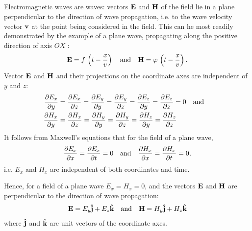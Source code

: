 \subsection{}\label{31.1.4} Electromagnetic waves are  waves: vectors $\vb{E}$ and $\vb{H}$ of the field lie in a plane perpendicular to the direction of wave propagation, i.e. to the wave velocity vector $\vb{v}$ at the point being considered in the field. This can he most readily demonstrated by the example of a plane wave, propagating along the positive direction of axis $OX$ :
\begin{equation*}%
\vb{E} = f\,\left(t - \frac{x}{v} \right) \qand \vb{H} = \varphi\,\left(t - \frac{x}{v} \right).
\end{equation*}
Vector $\vb{E}$ and $\vb{H}$ and their projections on the coordinate axes are independent of $y$ and $z$:
\begin{align*}%
\pdv{E_{x}}{y} & = \pdv{E_{x}}{z}= \pdv{E_{y}}{y} =\pdv{E_{y}}{z}= \pdv{E_{z}}{y}= \pdv{E_{z}}{z} =0 \qand \\
\pdv{H_{x}}{y} & = \pdv{H_{x}}{z}= \pdv{H_{y}}{y} =\pdv{H_{y}}{z}= \pdv{H_{z}}{y}= \pdv{H_{z}}{z}
\end{align*}
It follows from Maxwell's equations  that for the field of a plane wave,
\begin{equation*}%
\pdv{E_{x}}{x} = \pdv{E_{x}}{t} = 0 \qand \pdv{H_{x}}{x} = \pdv{H_{x}}{t} = 0,
\end{equation*}
i.e. $E_{x}$ and $H_{x}$ are independent of both coordinates and time.

Hence, for a  field of a plane  wave $E_{x} = H_{x} = 0$, and the vectors $\vb{E}$ and $\vb{H}$ are perpendicular to the direction of wave propagation:
\begin{equation*}%
\vb{E} = E_{y}\vu{j} + E_{z}\vu{k} \qand \vb{H} = H_{y}\vu{j} + H_{z}\vu{k} 
\end{equation*}
where $\vu{j}$ and $\vu{k}$ are unit vectors of the
coordinate axes.

